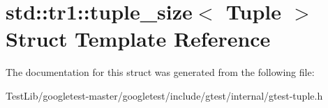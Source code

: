 \hypertarget{structstd_1_1tr1_1_1tuple__size}{}\section{std\+:\+:tr1\+:\+:tuple\+\_\+size$<$ Tuple $>$ Struct Template Reference}
\label{structstd_1_1tr1_1_1tuple__size}


The documentation for this struct was generated from the following file\+:\begin{DoxyCompactItemize}
\item 
Test\+Lib/googletest-\/master/googletest/include/gtest/internal/gtest-\/tuple.\+h\end{DoxyCompactItemize}
